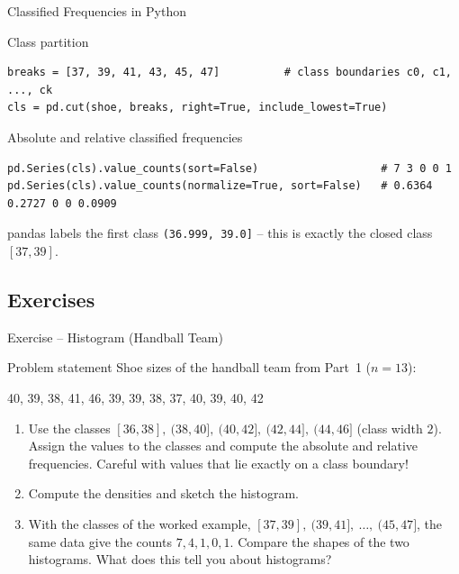 \documentclass[aspectratio=169,11pt]{beamer}
\begin{document}
\begin{frame}[fragile]{Classified Frequencies in Python}
  \begin{block}{Class partition}
    \begin{lstlisting}
breaks = [37, 39, 41, 43, 45, 47]          # class boundaries c0, c1, ..., ck
cls = pd.cut(shoe, breaks, right=True, include_lowest=True)
    \end{lstlisting}
  \end{block}
  \begin{block}{Absolute and relative classified frequencies}
    \begin{lstlisting}
pd.Series(cls).value_counts(sort=False)                   # 7 3 0 0 1
pd.Series(cls).value_counts(normalize=True, sort=False)   # 0.6364 0.2727 0 0 0.0909
    \end{lstlisting}
  \end{block}
  \footnotesize pandas labels the first class \texttt{(36.999, 39.0]} -- this is
  exactly the closed class $[37,39]$.
\end{frame}

\subsection{Exercises}
\begin{frame}{Exercise -- Histogram (Handball Team)}
  \begin{block}{Problem statement}
    Shoe sizes of the handball team from Part~1 ($n = 13$):
    \begin{center}
      40, 39, 38, 41, 46, 39, 39, 38, 37, 40, 39, 40, 42
    \end{center}
    \begin{enumerate}
      \item Use the classes $[36,38],\ (38,40],\ (40,42],\ (42,44],\ (44,46]$
            (class width $2$). Assign the values to the classes and compute the
            absolute and relative frequencies. Careful with values that lie
            exactly on a class boundary!
      \item Compute the densities and sketch the histogram.
      \item With the classes of the worked example, $[37,39],\ (39,41],\ \ldots,\ (45,47]$,
            the same data give the counts $7, 4, 1, 0, 1$. Compare the shapes of
            the two histograms. What does this tell you about histograms?
    \end{enumerate}
  \end{block}
\end{frame}
\end{document}
